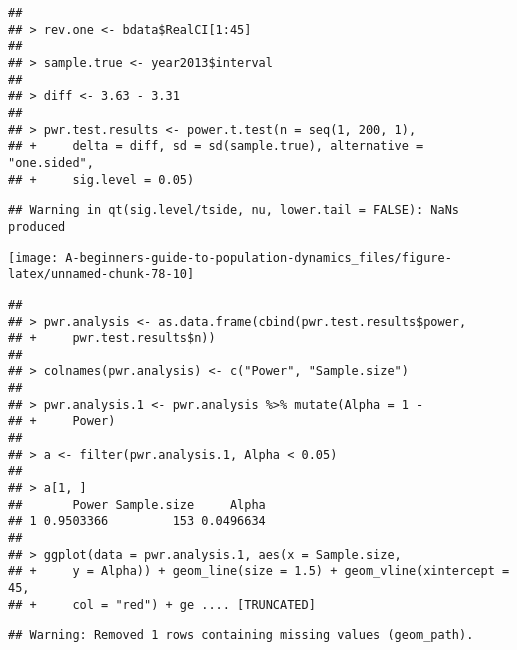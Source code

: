 \documentclass[]{book}
\begin{document}
\begin{verbatim}
## 
## > rev.one <- bdata$RealCI[1:45]
## 
## > sample.true <- year2013$interval
## 
## > diff <- 3.63 - 3.31
## 
## > pwr.test.results <- power.t.test(n = seq(1, 200, 1), 
## +     delta = diff, sd = sd(sample.true), alternative = "one.sided", 
## +     sig.level = 0.05)
\end{verbatim}

\begin{verbatim}
## Warning in qt(sig.level/tside, nu, lower.tail = FALSE): NaNs produced
\end{verbatim}

\begin{center}\texttt{[image: A-beginners-guide-to-population-dynamics\_files/figure-latex/unnamed-chunk-78-10]} \end{center}

\begin{verbatim}
## 
## > pwr.analysis <- as.data.frame(cbind(pwr.test.results$power, 
## +     pwr.test.results$n))
## 
## > colnames(pwr.analysis) <- c("Power", "Sample.size")
## 
## > pwr.analysis.1 <- pwr.analysis %>% mutate(Alpha = 1 - 
## +     Power)
## 
## > a <- filter(pwr.analysis.1, Alpha < 0.05)
## 
## > a[1, ]
##       Power Sample.size     Alpha
## 1 0.9503366         153 0.0496634
## 
## > ggplot(data = pwr.analysis.1, aes(x = Sample.size, 
## +     y = Alpha)) + geom_line(size = 1.5) + geom_vline(xintercept = 45, 
## +     col = "red") + ge .... [TRUNCATED]
\end{verbatim}

\begin{verbatim}
## Warning: Removed 1 rows containing missing values (geom_path).
\end{verbatim}
\end{document}
